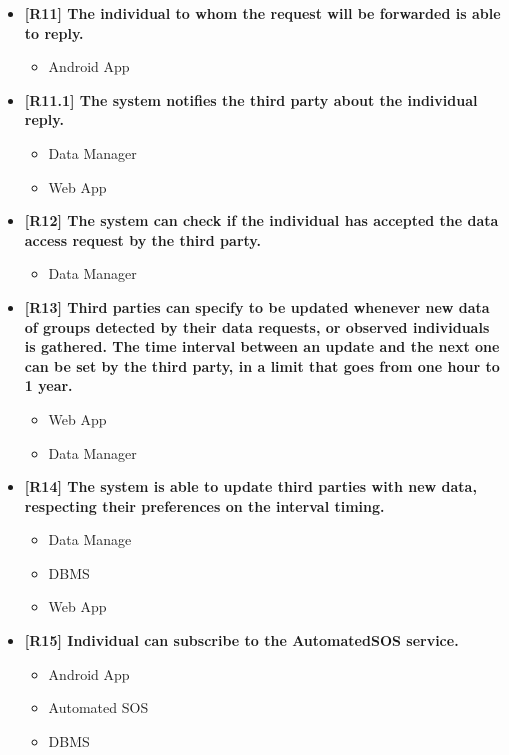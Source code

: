 \begin{itemize}
\item \textbf{[R11] The individual to whom the request will be forwarded is able to reply.}
\begin{itemize}
\item Android App
\end{itemize}


\item \textbf{[R11.1] The system notifies the third party about the individual reply.}
\begin{itemize}
\item Data Manager
\item Web App
\end{itemize}


\item \textbf{[R12] The system can check if the individual has accepted the data access request by the third party.}
\begin{itemize}
\item Data Manager
\end{itemize}

\item \textbf{[R13] Third parties can specify to be updated whenever new data of groups detected by their data requests, or observed individuals is gathered. The time interval between an update and the next one can be set by the third party, in a limit that goes from one hour to 1 year.}
\begin{itemize}
\item Web App
\item Data Manager
\end{itemize}


\item \textbf{[R14] The system is able to update third parties with new data, respecting their preferences on the interval timing.}
\begin{itemize}
\item Data Manage
\item DBMS
\item Web App
\end{itemize}

\item \textbf{[R15] Individual can subscribe to the AutomatedSOS service.}
\begin{itemize}
\item Android App
\item Automated SOS
\item DBMS
\end{itemize}



\end{itemize}
